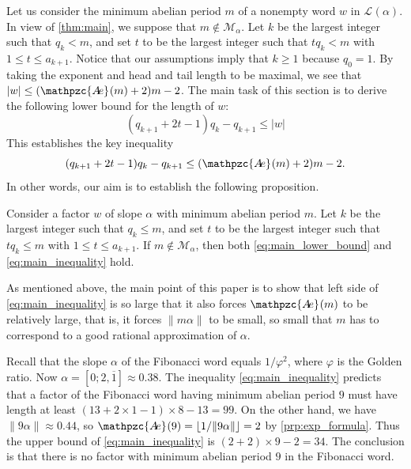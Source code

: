 \documentclass[a4paper,fleqn]{article}
\providecommand{\abs}[1]{\lvert#1\rvert}
\providecommand{\norm}[1]{\lVert#1\rVert}
\providecommand{\floor}[1]{\lfloor#1\rfloor}
\newcommand{\Lang}[2][]{\mathcal{L}_{#1}(#2)}
\newcommand{\abexp}[2][]{\mathpzc{A\mkern-3mu e}_{#1}(#2)}
\begin{document}
  Let us consider the minimum abelian period $m$ of a nonempty word $w$ in $\Lang{\alpha}$. In view of
  \autoref{thm:main}, we suppose that $m \notin \mathcal{M}_\alpha$. Let $k$ be the
  largest integer such that $q_k < m$, and set $t$ to be the largest integer such that $tq_k < m$ with
  $1 \leq t \leq a_{k+1}$. Notice that our assumptions imply that $k \geq 1$ because $q_0 = 1$. By taking the exponent
  and head and tail length to be maximal, we see that $\abs{w} \leq (\abexp{m} + 2)m - 2$. The main task of this
  section is to derive the following lower bound for the length of $w$:
  \begin{equation}\label{eq:main_lower_bound}
    (q_{k+1} + 2t - 1)q_k - q_{k+1} \leq \abs{w}
  \end{equation}
  This establishes the key inequality
  \begin{equation}\label{eq:main_inequality}
    (q_{k+1} + 2t - 1)q_k - q_{k+1} \leq (\abexp{m} + 2)m - 2.
  \end{equation}
  In other words, our aim is to establish the following proposition.
  
  \begin{proposition}\label{prp:main_inequality}
    Consider a factor $w$ of slope $\alpha$ with minimum abelian period $m$. Let $k$ be the largest integer such that
    $q_k \leq m$, and set $t$ to be the largest integer such that $tq_k \leq m$ with $1 \leq t \leq a_{k+1}$. If
    $m \notin \mathcal{M}_\alpha$, then both \eqref{eq:main_lower_bound} and \eqref{eq:main_inequality} hold.
  \end{proposition}

  As mentioned above, the main point of this paper is to show that left side of \eqref{eq:main_inequality} is so large
  that it also forces $\abexp{m}$ to be relatively large, that is, it forces $\norm{m\alpha}$ to be small, so small
  that $m$ has to correspond to a good rational approximation of $\alpha$.

  \begin{example}
    Recall that the slope $\alpha$ of the Fibonacci word equals $1/\varphi^2$, where $\varphi$ is the Golden ratio.
    Now $\alpha = [0; 2, \overline{1}] \approx 0.38$. The inequality \eqref{eq:main_inequality} predicts that a factor
    of the Fibonacci word having minimum abelian period $9$ must have length at least
    $(13 + 2 \times 1 - 1) \times 8 - 13 = 99$. On the other hand, we have $\norm{9\alpha} \approx 0.44$, so
    $\abexp{9} = \floor{1/\norm{9\alpha}} = 2$ by \autoref{prp:exp_formula}. Thus the upper bound of
    \eqref{eq:main_inequality} is $(2 + 2) \times 9 - 2 = 34$. The conclusion is that there is no factor with minimum
    abelian period $9$ in the Fibonacci word.
  \end{example}
  
\end{document}
